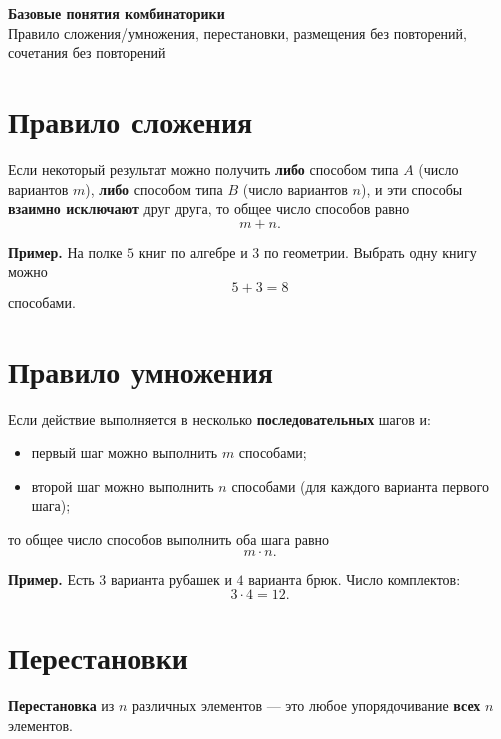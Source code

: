 
\begin{center}
    {\LARGE \textbf{Базовые понятия комбинаторики}}\\
    \vspace{4pt}
    {\small Правило сложения/умножения, перестановки, размещения без повторений, сочетания без повторений}
\end{center}

\section{Правило сложения}

Если некоторый результат можно получить \textbf{либо} способом типа $A$ (число вариантов $m$),
\textbf{либо} способом типа $B$ (число вариантов $n$), и эти способы \textbf{взаимно исключают} друг друга,
то общее число способов равно
\[
m+n.
\]

\textbf{Пример.} На полке $5$ книг по алгебре и $3$ по геометрии. Выбрать одну книгу можно
\[
5+3=8
\]
способами.

\newpage

\hspace{3mm}

\section{Правило умножения}

Если действие выполняется в несколько \textbf{последовательных} шагов и:
\begin{itemize}
    \item первый шаг можно выполнить $m$ способами;
    \item второй шаг можно выполнить $n$ способами (для каждого варианта первого шага);
\end{itemize}
то общее число способов выполнить оба шага равно
\[
m\cdot n.
\]

\textbf{Пример.} Есть $3$ варианта рубашек и $4$ варианта брюк. Число комплектов:
\[
3\cdot 4 = 12.
\]

\newpage

\hspace{3mm}

\section{Перестановки}

\textbf{Перестановка} из $n$ различных элементов — это любое упорядочивание \textbf{всех} $n$ элементов.


